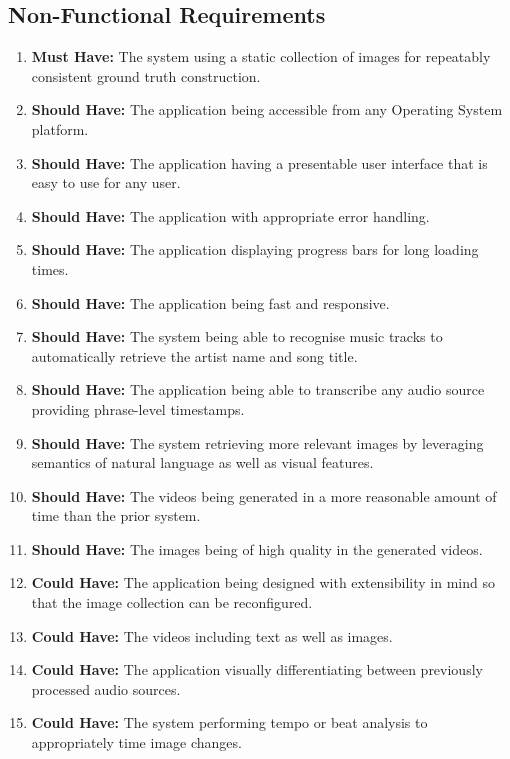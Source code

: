 \documentclass{l4proj}
\begin{document}
\subsection{Non-Functional Requirements}
\begin{enumerate}[resume]
    \item \label{req:18} \textbf{Must Have:} The system using a static collection of images for repeatably consistent ground truth construction.
    \item \label{req:19} \textbf{Should Have:} The application being accessible from any Operating System platform.
    \item \label{req:20} \textbf{Should Have:} The application having a presentable user interface that is easy to use for any user.
    \item \label{req:21} \textbf{Should Have:} The application with appropriate error handling.
    \item \label{req:22} \textbf{Should Have:} The application displaying progress bars for long loading times.
    \item \label{req:23} \textbf{Should Have:} The application being fast and responsive.
    \item \label{req:24} \textbf{Should Have:} The system being able to recognise music tracks to automatically retrieve the artist name and song title.
    \item \label{req:25} \textbf{Should Have:} The application being able to transcribe any audio source providing phrase-level timestamps.
    \item \label{req:26} \textbf{Should Have:} The system retrieving more relevant images by leveraging semantics of natural language as well as visual features.
    \item \label{req:27} \textbf{Should Have:} The videos being generated in a more reasonable amount of time than the prior system.
    \item \label{req:28} \textbf{Should Have:} The images being of high quality in the generated videos.
    \item \label{req:29} \textbf{Could Have:} The application being designed with extensibility in mind so that the image collection can be reconfigured.
    \item \label{req:30} \textbf{Could Have:} The videos including text as well as images.
    \item \label{req:31} \textbf{Could Have:} The application visually differentiating between previously processed audio sources.
    \item \label{req:32} \textbf{Could Have:} The system performing tempo or beat analysis to appropriately time image changes.
\end{enumerate}
\end{document}
